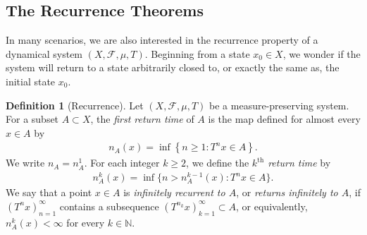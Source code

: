 \documentclass{article}
\numberwithin{equation}{section}
\newcommand{\bbN}{\mathbb{N}}
\newcommand{\scr}{\mathscr}
\theoremstyle{plain}
\theoremstyle{definition}
\newtheorem{definition}[theorem]{Definition}
\begin{document}
\subsection{The Recurrence Theorems}
In many scenarios, we are also interested in the recurrence property of a dynamical system $(X,\scr{F},\mu,T)$. Beginning from a state $x_0\in X$, we wonder if the system will return to a state arbitrarily closed to, or exactly the same as, the initial state $x_0$.
\begin{definition}[Recurrence]
Let $(X,\scr{F},\mu,T)$ be a measure-preserving system. For a subset $A\subset X$, the \textit{first return time} of $A$ is the map defined for almost every $x\in A$ by
\begin{align*}
	n_A(x)=\inf\left\{n\geq 1:T^nx\in A\right\}.
\end{align*}
We write $n_A=n_A^1$. For each integer $k\geq 2$, we define the \textit{$k^\text{th}$ return time} by
\begin{align*}
	n_A^k(x)=\inf\{n>n_A^{k-1}(x):T^nx\in A\}.
\end{align*}
We say that a point $x\in A$ is \textit{infinitely recurrent to $A$}, or \textit{returns infinitely to $A$}, if $(T^nx)_{n=1}^\infty$ contains a subsequence $(T^{n_k}x)_{k=1}^\infty\subset A$, or equivalently, $n_A^k(x)<\infty$ for every $k\in\bbN$.
\end{definition}
\end{document}

